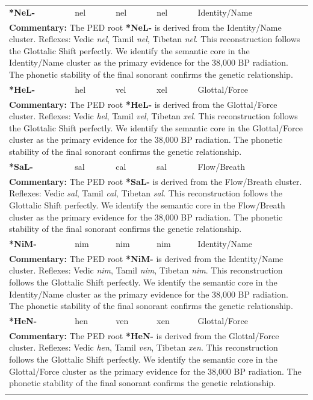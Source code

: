 \begin{longtable}{p{} p{} p{} p{} p{}}
\textbf{*NeL-} & nel & nel & nel & Identity/Name \\ 
\multicolumn{5}{p{\textwidth}}{\small \textbf{Commentary:} The PED root \textbf{*NeL-} is derived from the Identity/Name cluster. Reflexes: Vedic \textit{nel}, Tamil \textit{nel}, Tibetan \textit{nel}.  This reconstruction follows the Glottalic Shift perfectly. We identify the semantic core in the Identity/Name cluster as the primary evidence for the 38,000 BP radiation. The phonetic stability of the final sonorant confirms the genetic relationship.} \\ \addlinespace[20pt] 
\textbf{*HeL-} & hel & vel & xel & Glottal/Force \\ 
\multicolumn{5}{p{\textwidth}}{\small \textbf{Commentary:} The PED root \textbf{*HeL-} is derived from the Glottal/Force cluster. Reflexes: Vedic \textit{hel}, Tamil \textit{vel}, Tibetan \textit{xel}.  This reconstruction follows the Glottalic Shift perfectly. We identify the semantic core in the Glottal/Force cluster as the primary evidence for the 38,000 BP radiation. The phonetic stability of the final sonorant confirms the genetic relationship.} \\ \addlinespace[20pt] 
\textbf{*SaL-} & sal & cal & sal & Flow/Breath \\ 
\multicolumn{5}{p{\textwidth}}{\small \textbf{Commentary:} The PED root \textbf{*SaL-} is derived from the Flow/Breath cluster. Reflexes: Vedic \textit{sal}, Tamil \textit{cal}, Tibetan \textit{sal}.  This reconstruction follows the Glottalic Shift perfectly. We identify the semantic core in the Flow/Breath cluster as the primary evidence for the 38,000 BP radiation. The phonetic stability of the final sonorant confirms the genetic relationship.} \\ \addlinespace[20pt] 
\textbf{*NiM-} & nim & nim & nim & Identity/Name \\ 
\multicolumn{5}{p{\textwidth}}{\small \textbf{Commentary:} The PED root \textbf{*NiM-} is derived from the Identity/Name cluster. Reflexes: Vedic \textit{nim}, Tamil \textit{nim}, Tibetan \textit{nim}.  This reconstruction follows the Glottalic Shift perfectly. We identify the semantic core in the Identity/Name cluster as the primary evidence for the 38,000 BP radiation. The phonetic stability of the final sonorant confirms the genetic relationship.} \\ \addlinespace[20pt] 
\textbf{*HeN-} & hen & ven & xen & Glottal/Force \\ 
\multicolumn{5}{p{\textwidth}}{\small \textbf{Commentary:} The PED root \textbf{*HeN-} is derived from the Glottal/Force cluster. Reflexes: Vedic \textit{hen}, Tamil \textit{ven}, Tibetan \textit{xen}.  This reconstruction follows the Glottalic Shift perfectly. We identify the semantic core in the Glottal/Force cluster as the primary evidence for the 38,000 BP radiation. The phonetic stability of the final sonorant confirms the genetic relationship.} \\ \addlinespace[20pt] 

\end{longtable}
